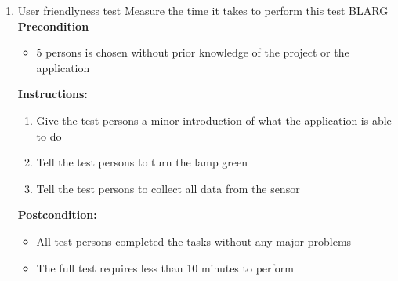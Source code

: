 \documentclass[a4paper]{article}
\newlength{\testlabellength}
\newenvironment{testlist}{\begin{enumerate}[label=\bfseries Instruction \thesubsection.\arabic* , labelindent=0pt, labelwidth=\testlabellength , leftmargin=2cm]}{\end{enumerate}}
\newenvironment{precondition}{
{\color{white}BLARG}\\ 
\textbf{Precondition}
\begin{itemize}[labelindent=0cm, labelwidth=2cm , leftmargin=1cm]
}
{\end{itemize}}
\newenvironment{instruction}{
\textbf{Instructions:}
\begin{enumerate}[label=\bfseries  \arabic*., labelindent=0cm, labelwidth=2cm , leftmargin=1cm]
}
{\end{enumerate}}
\newenvironment{postcondition}{
\textbf{Postcondition:}
\begin{itemize}[labelindent=0cm, labelwidth=2cm , leftmargin=1cm]
}
{\end{itemize}}
\begin{document}
\begin{appendices}
\begin{testlist}
	\item User friendlyness test \newline
		Measure the time it takes to perform this test
		\begin{precondition}
			\item 5 persons is chosen without prior knowledge of the project or the application
		\end{precondition}
		\begin{instruction}
			\item Give the test persons a minor introduction of what the application is able to do
            \item Tell the test persons to turn the lamp green
            \item Tell the test persons to collect all data from the sensor
		\end{instruction}
		\begin{postcondition}
			\item All test persons completed the tasks without any major problems
			\item The full test requires less than 10 minutes to perform
		\end{postcondition}


\end{testlist}
\end{appendices}
\end{document}
